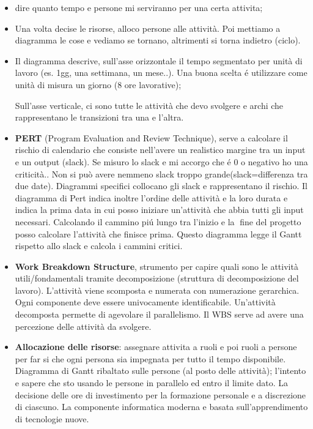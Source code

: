 \documentclass[a4paper,10pt] {article}
\begin{document}
\begin{itemize}
\begin{itemize}
\begin{itemize}
\item dire quanto tempo e persone mi serviranno per una certa attivita;


\item Una volta decise le risorse, alloco persone alle attività. Poi mettiamo 
a diagramma le cose e vediamo se tornano, altrimenti si torna indietro (ciclo). 

\item Il diagramma descrive, sull'asse orizzontale il tempo segmentato per
unità di lavoro (es. 1gg, una settimana, un mese..). Una buona scelta é 
utilizzare come unità di misura un giorno (8 ore lavorative); 

Sull'asse verticale, ci sono tutte le attività che devo svolgere e archi che 
rappresentano le transizioni tra una e l'altra.



\item \textbf{PERT} (Program Evaluation and Review Technique), serve a 
calcolare il rischio di calendario che consiste nell'avere un realistico 
margine tra un input e un output (slack). Se misuro lo slack e mi accorgo che 
é 0 o negativo ho una criticità.. Non si può avere nemmeno
slack troppo grande(slack=differenza tra due date). Diagrammi specifici 
collocano gli slack e rappresentano il rischio. Il diagramma di Pert indica 
inoltre l'ordine delle attività e la loro durata e indica la prima data in 
cui posso iniziare un'attività che abbia tutti gli input necessari. 
Calcolando il cammino pi\'u lungo tra l'inizio e la fine  del progetto 
posso calcolare l'attività che finisce prima. Questo diagramma legge il Gantt 
rispetto allo slack e calcola i 
cammini critici.


\item \textbf{Work Breakdown Structure}, strumento per capire 
quali sono le attività utili/fondamentali tramite decomposizione (struttura 
di decomposizione del lavoro). L'attività viene scomposta e numerata con 
numerazione gerarchica. Ogni componente deve essere univocamente identificabile.
Un'attività decomposta permette di agevolare il parallelismo. Il WBS 
serve ad avere una percezione delle attività da svolgere.



\item \textbf{Allocazione delle risorse}: 
assegnare attivita a ruoli e poi ruoli a persone per far si che ogni persona 
sia impegnata per tutto il tempo disponibile. Diagramma di Gantt ribaltato 
sulle persone (al posto delle attività); l'intento e sapere che sto usando le 
persone in parallelo ed entro il limite dato. La decisione delle ore di 
investimento per la formazione personale e a discrezione di ciascuno. La 
componente informatica moderna e basata sull'apprendimento di tecnologie nuove. 



\end{itemize}
\end{itemize}
\end{itemize}
\end{document}
